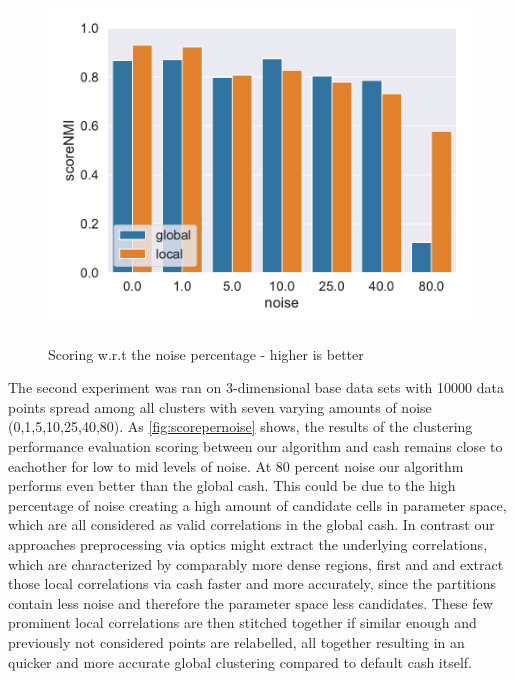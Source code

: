 \begin{figure}[h]
\begin{minipage}[t]{.5\textwidth}
      \includegraphics[width=\textwidth]{evaluation/per_noise/Best_NMI_3D_O10000_pnoise_bar.pdf}
      \label{fig:nmiperpts}
    \end{minipage}    
    \caption{Scoring w.r.t the noise percentage - higher is better}
    \label{fig:scorepernoise}
\end{figure}
The second experiment was ran on 3-dimensional base data sets with 10000 data points spread among all clusters with seven varying amounts of noise (0,1,5,10,25,40,80).
As \autoref{fig:scorepernoise} shows, the results of the clustering performance evaluation scoring between our algorithm and \gls{cash} remains close to eachother for low to mid levels of noise. At 80 percent noise our algorithm performs even better than the global \gls{cash}. This could be due to the high percentage of noise creating a high amount of candidate cells in parameter space, which are all considered as valid correlations in the global \gls{cash}. In contrast our approaches preprocessing via \gls{optics} might extract the underlying correlations, which are characterized by comparably more dense regions, first and and extract those local correlations via \gls{cash} faster and more accurately, since the partitions contain less noise and therefore the parameter space less candidates. These few prominent local correlations are then stitched together if similar enough and previously not considered points are relabelled, all together resulting in an quicker and more accurate global clustering compared to default \gls{cash} itself.

